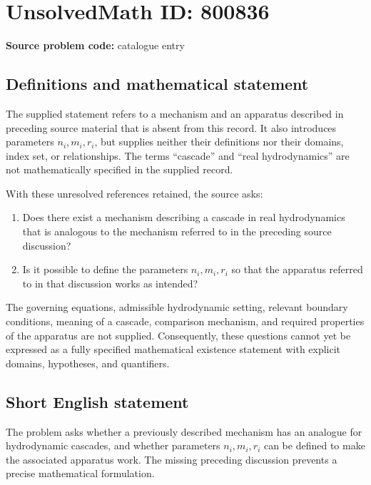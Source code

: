 \documentclass[11pt]{article}
\begin{document}
\section*{UnsolvedMath ID: 800836}
\textbf{Source problem code:} catalogue entry
\subsection{Definitions and mathematical statement}
The supplied statement refers to a mechanism and an apparatus described in preceding source material that is absent from this record. It also introduces parameters \(n_i,m_i,r_i\), but supplies neither their definitions nor their domains, index set, or relationships. The terms ``cascade'' and ``real hydrodynamics'' are not mathematically specified in the supplied record.

With these unresolved references retained, the source asks:
\begin{enumerate}
\item Does there exist a mechanism describing a cascade in real hydrodynamics that is analogous to the mechanism referred to in the preceding source discussion?
\item Is it possible to define the parameters \(n_i,m_i,r_i\) so that the apparatus referred to in that discussion works as intended?
\end{enumerate}
The governing equations, admissible hydrodynamic setting, relevant boundary conditions, meaning of a cascade, comparison mechanism, and required properties of the apparatus are not supplied. Consequently, these questions cannot yet be expressed as a fully specified mathematical existence statement with explicit domains, hypotheses, and quantifiers.
\subsection{Short English statement}
The problem asks whether a previously described mechanism has an analogue for hydrodynamic cascades, and whether parameters \(n_i,m_i,r_i\) can be defined to make the associated apparatus work. The missing preceding discussion prevents a precise mathematical formulation.
\end{document}
